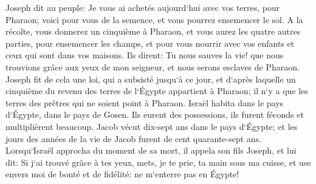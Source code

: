 \verse Joseph dit au peuple: Je vous ai achetés aujourd`hui avec vos terres, pour Pharaon; voici pour vous de la semence, et vous pourrez ensemencer le sol. 
\verse A la récolte, vous donnerez un cinquième à Pharaon, et vous aurez les quatre autres parties, pour ensemencer les champs, et pour vous nourrir avec vos enfants et ceux qui sont dans vos maisons. 
\verse Ils dirent: Tu nous sauves la vie! que nous trouvions grâce aux yeux de mon seigneur, et nous serons esclaves de Pharaon. 
\verse Joseph fit de cela une loi, qui a subsisté jusqu`à ce jour, et d`après laquelle un cinquième du revenu des terres de l`Égypte appartient à Pharaon; il n`y a que les terres des prêtres qui ne soient point à Pharaon. 
\verse Israël habita dans le pays d`Égypte, dans le pays de Gosen. Ils eurent des possessions, ils furent féconds et multiplièrent beaucoup. 
\verse Jacob vécut dix-sept ans dans le pays d`Égypte; et les jours des années de la vie de Jacob furent de cent quarante-sept ans. 
\verse Lorsqu`Israël approcha du moment de sa mort, il appela son fils Joseph, et lui dit: Si j`ai trouvé grâce à tes yeux, mets, je te prie, ta main sous ma cuisse, et use envers moi de bonté et de fidélité: ne m`enterre pas en Égypte! 
